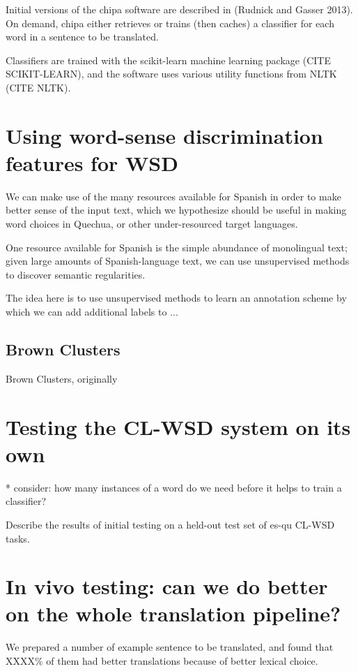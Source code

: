\documentclass[10pt, a4paper]{article}
\begin{document}
Initial versions of the chipa software are described in (Rudnick and Gasser 2013). On demand, chipa either retrieves or trains (then caches) a classifier for each word in a sentence to be translated.


Classifiers are trained with the scikit-learn machine learning package (CITE SCIKIT-LEARN), and the software uses various utility functions from NLTK (CITE NLTK).


\section{Using word-sense discrimination features for WSD}


We can make use of the many resources available for Spanish in order to make better sense of the input text, which we hypothesize should be useful in making word choices in Quechua, or other under-resourced target languages.


One resource available for Spanish is the simple abundance of monolingual text; given large amounts of Spanish-language text, we can use unsupervised methods to discover semantic regularities.


The idea here is to use unsupervised methods to learn an annotation scheme by which we can add additional labels to ...


\subsection{Brown Clusters}
Brown Clusters, originally 




\section{Testing the CL-WSD system on its own}
* consider: how many instances of a word do we need before it helps to train a classifier?


Describe the results of initial testing on a held-out test set of es-qu CL-WSD tasks.


\section{In vivo testing: can we do better on the whole translation pipeline?}


We prepared a number of example sentence to be translated, and found that XXXX\% of them had better translations because of better lexical choice.
\end{document}
